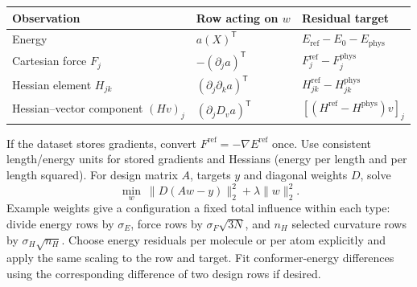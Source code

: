 \documentclass[11pt,a4paper]{article}
\newcommand{\T}{\mathsf T}\newcommand{\tr}{\operatorname{tr}}
\newcommand{\phys}{\mathrm{phys}}\newcommand{\refm}{\mathrm{ref}}
\newcommand{\D}{\partial}\newcommand{\alg}[1]{\par\smallskip{\sffamily\bfseries\color{tealblue}#1}\par\nobreak}
\begin{document}
\begin{center}\small
\begin{tabularx}{\linewidth}{@{}lXX@{}}\toprule
Observation & Row acting on $w$ & Residual target\\\midrule
Energy & $a(X)^\T$ & $E_{\refm}-E_0-E_{\phys}$\\
Cartesian force $F_j$ & $-(\D_j a)^\T$ & $F^{\refm}_j-F^{\phys}_j$\\
Hessian element $H_{jk}$ & $(\D_j\D_k a)^\T$ & $H^{\refm}_{jk}-H^{\phys}_{jk}$\\
Hessian--vector component $(Hv)_j$ & $(\D_jD_v a)^\T$ & $[(H^{\refm}-H^{\phys})v]_j$\\\bottomrule
\end{tabularx}
\end{center}
If the dataset stores gradients, convert $F^{\refm}=-\nabla E^{\refm}$ once. Use consistent length/energy units for stored gradients and Hessians (energy per length and per length squared). For design matrix $A$, targets $y$ and diagonal weights $D$, solve
\begin{equation}
 \min_w\ \|D(Aw-y)\|_2^2+\lambda\|w\|_2^2. \label{eq:ridge}
\end{equation}
Example weights give a configuration a fixed total influence within each type: divide energy rows by $\sigma_E$, force rows by $\sigma_F\sqrt{3N}$, and $n_H$ selected curvature rows by $\sigma_H\sqrt{n_H}$. Choose energy residuals per molecule or per atom explicitly and apply the same scaling to the row and target. Fit conformer-energy differences using the corresponding difference of two design rows if desired.
\end{document}
